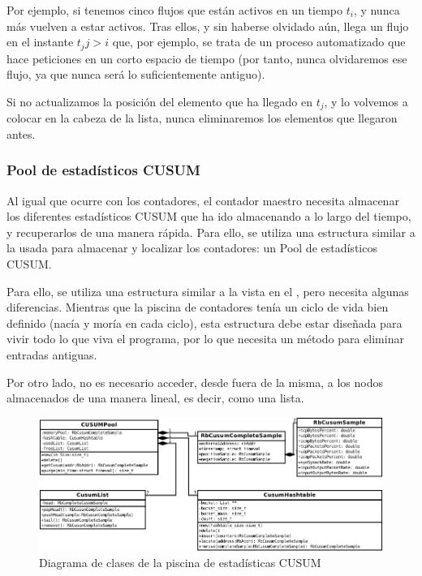Por ejemplo, si tenemos cinco flujos que están activos en un tiempo $t_i$, y nunca más vuelven a estar activos. Tras 
ellos, y sin haberse olvidado aún, llega un flujo en el instante $t_j j>i$ que, por ejemplo, se trata de un proceso 
automatizado que hace peticiones en un corto espacio de tiempo (por tanto, nunca olvidaremos ese flujo, ya que nunca 
será lo suficientemente antiguo).

Si no actualizamos la posición del elemento que ha llegado en $t_j$, y lo volvemos a colocar en la cabeza de la lista, 
nunca eliminaremos los elementos que llegaron antes.

\subsubsection{Pool de estadísticos CUSUM}

Al igual que ocurre con los contadores, el contador maestro necesita almacenar los diferentes estadísticos CUSUM que ha 
ido almacenando a lo largo del tiempo, y recuperarlos de una manera rápida. Para ello, se utiliza una estructura 
similar a la usada para almacenar y localizar los contadores: un Pool de estadísticos CUSUM.

Para ello, se utiliza una estructura similar a la vista en el , pero necesita algunas 
diferencias. Mientras que la piscina de contadores tenía un ciclo de vida bien definido (nacía y moría en cada ciclo), 
esta estructura debe estar diseñada para vivir todo lo que viva el programa, por lo que necesita un método para 
eliminar entradas antiguas.

Por otro lado, no es necesario acceder, desde fuera de la misma, a los nodos almacenados de una manera 
lineal, es decir, como una lista.

\begin{figure}[htbp]
\centering
\includegraphics[width=\textwidth]{CapituloEstructura/Figuras/DiagramaClasesCUSUM-crop}
\caption{Diagrama de clases de la piscina de estadísticas CUSUM}
\end{figure}
%


